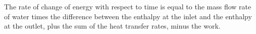 The rate of change of energy with respect to time is equal to the mass flow rate of water times the difference between the enthalpy at the inlet and the enthalpy at the outlet, plus the sum of the heat transfer rates, minus the work.